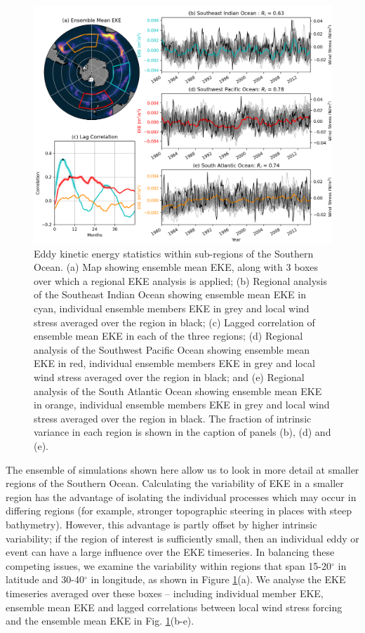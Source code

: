 \documentclass[linenumbers]{agujournal2019}
\begin{document}
\begin{figure}[t]
\begin{center}
\includegraphics[width=\hsize]{Figure3}
\caption{Eddy kinetic energy statistics within sub-regions of the Southern Ocean. (a) Map showing ensemble mean EKE, along with 3 boxes over which a regional EKE analysis is applied; (b) Regional analysis of the Southeast Indian Ocean showing ensemble mean EKE in cyan, individual ensemble members EKE in grey and local wind stress averaged over the region in black; (c) Lagged correlation of ensemble mean EKE in each of the three regions; (d) Regional analysis of the Southwest Pacific Ocean showing ensemble mean EKE in red, individual ensemble members EKE in grey and local wind stress averaged over the region in black; and (e) Regional analysis of the South Atlantic Ocean showing ensemble mean EKE in orange, individual ensemble members EKE in grey and local wind stress averaged over the region in black. The fraction of intrinsic variance in each region is shown in the caption of panels (b), (d) and (e).}
\label{Fig:3}
\end{center}
\end{figure}

The ensemble of simulations shown here allow us to look in more detail at smaller regions of the Southern Ocean.
Calculating the variability of EKE in a smaller region has the advantage of isolating the individual processes which may occur in differing regions (for example, stronger topographic steering in places with steep bathymetry).
However, this advantage is partly offset by higher intrinsic variability;  if the region of interest is sufficiently small, then an individual eddy or event can have a large influence over the EKE timeseries.
In balancing these competing issues, we examine the variability within regions that span 15-20$^\circ$ in latitude and 30-40$^\circ$ in longitude, as shown in Figure \ref{Fig:3}(a).
We analyse the EKE timeseries averaged over these boxes -- including individual member EKE, ensemble mean EKE and lagged correlations between local wind stress forcing and the ensemble mean EKE in Fig. \ref{Fig:3}(b-e).
\end{document}
